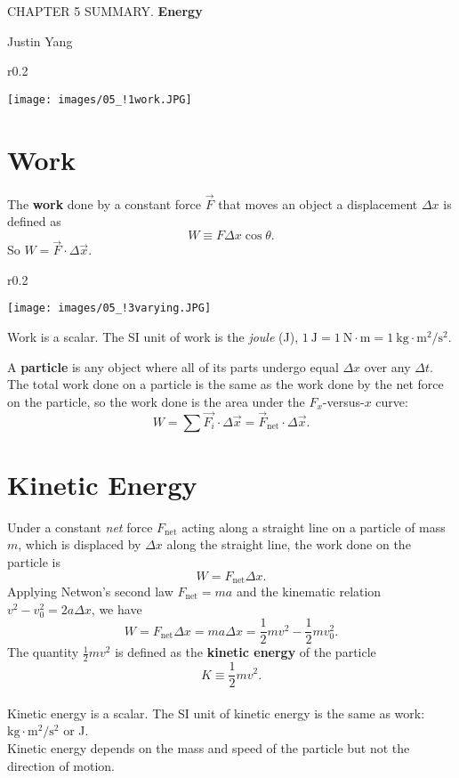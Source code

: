 \documentclass[11pt,a4paper]{report}
\begin{document}
\pagestyle{empty}
\setcounter{secnumdepth}{0}

\begin{center}
\Large{CHAPTER 5 SUMMARY. \textbf{Energy}}

\large{Justin Yang}

\end{center}

\begin{wrapfigure}{r}{0.2\textwidth}
\vspace{-20pt}
\begin{center}
\texttt{[image: images/05\_!1work.JPG]}
\end{center}
\end{wrapfigure}
\section{Work}
The \textbf{work} done by a constant force $\vec{F}$ that moves an object a displacement $\Delta{x}$ is defined as $$W \equiv F \Delta{x} \cos{\theta}.$$ So $W = \vec{F} \cdot \Delta{\vec{x}}$.

\begin{wrapfigure}{r}{0.2\textwidth}
\vspace{-10pt}
\begin{center}
\texttt{[image: images/05\_!3varying.JPG]}
\end{center}
\end{wrapfigure}

\noindent
Work is a scalar. The SI unit of work is the \textit{joule} (J), $1 \mathrm{\ J} = 1 \mathrm{\ N} \cdot \mathrm{m} = 1 \mathrm{\ kg} \cdot \mathrm{m}^2 / \mathrm{s}^2$.

\smallskip

\noindent
A \textbf{particle} is any object where all of its parts undergo equal $\Delta{x}$ over any $\Delta{t}$.
\\The total work done on a particle is the same as the work done by the net force on the particle, so the work done is the area under the $F_x$-versus-$x$ curve: $$W = \sum{\vec{F_i}} \cdot \Delta{\vec{x}} = \vec{F}_\mathrm{net} \cdot \Delta{\vec{x}}.$$

\section{Kinetic Energy}
Under a constant \textit{net} force $F_\mathrm{net}$ acting along a straight line on a particle of mass $m$, which is displaced by $\Delta{x}$ along the straight line, the work done on the particle is $$W = F_\mathrm{net} \Delta{x}.$$
Applying Netwon's second law $F_\mathrm{net} = ma$ and the kinematic relation $v^2 - v_0^2 = 2a \Delta{x}$, we have $$W = F_\mathrm{net} \Delta{x} = ma \Delta{x} = \frac{1}{2} mv^2 - \frac{1}{2} mv_0^2.$$
The quantity $\frac{1}{2} mv^2$ is defined as the \textbf{kinetic energy} of the particle $$K \equiv \frac{1}{2} mv^2.$$
\\Kinetic energy is a scalar. The SI unit of kinetic energy is the same as work: $\mathrm{kg} \cdot \mathrm{m}^2 / \mathrm{s}^2$ or J.
\\Kinetic energy depends on the mass and speed of the particle but not the direction of motion.
\end{document}

